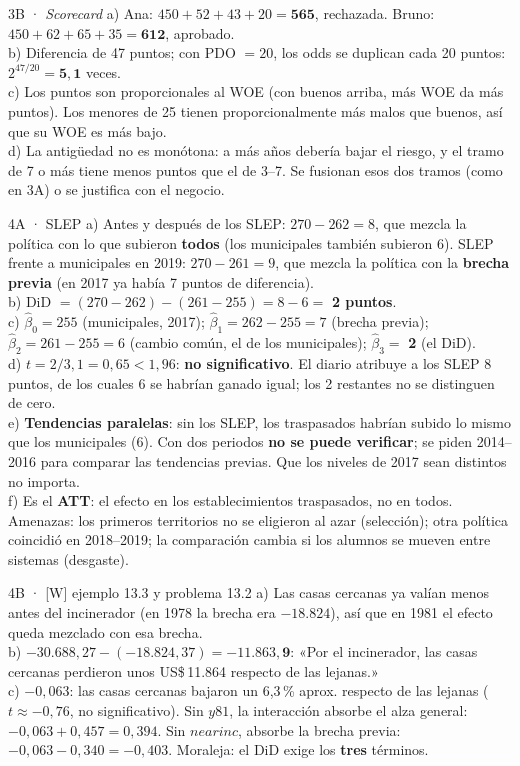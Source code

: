 \documentclass[11pt]{article}
\begin{document}
\begin{pauta}{3B · \emph{Scorecard}}
a) Ana: $450+52+43+20=\mathbf{565}$, rechazada. Bruno: $450+62+65+35=\mathbf{612}$, aprobado.\\
b) Diferencia de 47 puntos; con PDO $=20$, los odds se duplican cada 20 puntos: $2^{47/20}=\mathbf{5{,}1}$ veces.\\
c) Los puntos son proporcionales al WOE (con buenos arriba, más WOE da más puntos). Los menores de 25 tienen proporcionalmente más malos que buenos, así que su WOE es más bajo.\\
d) La antigüedad no es monótona: a más años debería bajar el riesgo, y el tramo de 7 o más tiene menos puntos que el de 3--7. Se fusionan esos dos tramos (como en 3A) o se justifica con el negocio.
\end{pauta}

\begin{pauta}{4A · SLEP}
a) Antes y después de los SLEP: $270-262=8$, que mezcla la política con lo que subieron \textbf{todos} (los municipales también subieron 6). SLEP frente a municipales en 2019: $270-261=9$, que mezcla la política con la \textbf{brecha previa} (en 2017 ya había 7 puntos de diferencia).\\
b) DiD $=(270-262)-(261-255)=8-6=$ \textbf{2 puntos}.\\
c) $\hat\beta_0=255$ (municipales, 2017); $\hat\beta_1=262-255=7$ (brecha previa); $\hat\beta_2=261-255=6$ (cambio común, el de los municipales); $\hat\beta_3=$ \textbf{2} (el DiD).\\
d) $t=2/3{,}1=0{,}65<1{,}96$: \textbf{no significativo}. El diario atribuye a los SLEP 8 puntos, de los cuales 6 se habrían ganado igual; los 2 restantes no se distinguen de cero.\\
e) \textbf{Tendencias paralelas}: sin los SLEP, los traspasados habrían subido lo mismo que los municipales (6). Con dos periodos \textbf{no se puede verificar}; se piden 2014--2016 para comparar las tendencias previas. Que los niveles de 2017 sean distintos no importa.\\
f) Es el \textbf{ATT}: el efecto en los establecimientos traspasados, no en todos. Amenazas: los primeros territorios no se eligieron al azar (selección); otra política coincidió en 2018--2019; la comparación cambia si los alumnos se mueven entre sistemas (desgaste).
\end{pauta}

\begin{pauta}{4B · [W] ejemplo 13.3 y problema 13.2}
a) Las casas cercanas ya valían menos antes del incinerador (en 1978 la brecha era $-18.824$), así que en 1981 el efecto queda mezclado con esa brecha.\\
b) $-30.688{,}27-(-18.824{,}37)=\mathbf{-11.863{,}9}$: «Por el incinerador, las casas cercanas perdieron unos US\$\,11.864 respecto de las lejanas.»\\
c) $-0{,}063$: las casas cercanas bajaron un 6,3\,\% aprox. respecto de las lejanas ($t\approx-0{,}76$, no significativo). Sin $y81$, la interacción absorbe el alza general: $-0{,}063+0{,}457=0{,}394$. Sin $nearinc$, absorbe la brecha previa: $-0{,}063-0{,}340=-0{,}403$. Moraleja: el DiD exige los \textbf{tres} términos.
\end{pauta}
\end{document}
